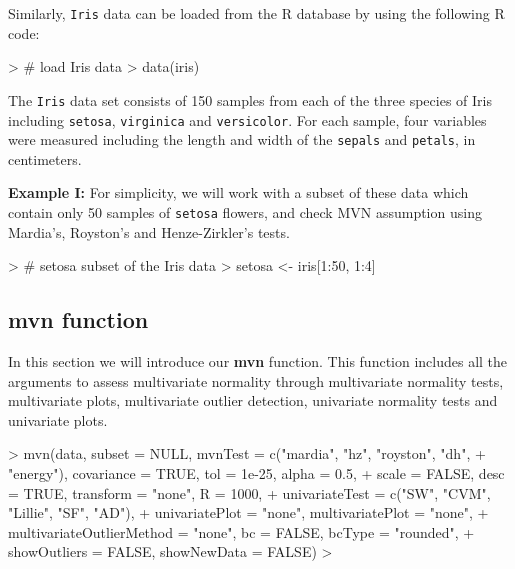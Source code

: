 \documentclass[11pt]{article}
\begin{document}
Similarly, \texttt{Iris} data can be loaded from the R database by using the following R code:


\begin{Schunk}
\begin{Sinput}
> # load Iris data
> data(iris)
\end{Sinput}
\end{Schunk}

The \texttt{Iris} data set consists of 150 samples from each of the three species of Iris including \texttt{setosa}, \texttt{virginica} and \texttt{versicolor}. For each sample, four variables were measured including the length and width of the \texttt{sepals} and \texttt{petals}, in centimeters. \\
\newline

\textbf{Example I:} For simplicity, we will work with a subset of these data which contain only 50 samples of \texttt{setosa} flowers, and check MVN assumption using Mardia's, Royston's and Henze-Zirkler's tests.


\begin{Schunk}
\begin{Sinput}
> # setosa subset of the Iris data
> setosa <- iris[1:50, 1:4]
\end{Sinput}
\end{Schunk}

\subsection{mvn function} \label{subsec:mvntexttt}
In this section we will introduce our \textbf{mvn} function. This function includes all the arguments to assess multivariate normality through  multivariate normality tests, multivariate plots, multivariate outlier detection, univariate normality tests and univariate plots.


\begin{Schunk}
\begin{Sinput}
> mvn(data, subset = NULL, mvnTest = c("mardia", "hz", "royston", "dh",
+   "energy"), covariance = TRUE, tol = 1e-25, alpha = 0.5,
+   scale = FALSE, desc = TRUE, transform = "none", R = 1000,
+   univariateTest = c("SW", "CVM", "Lillie", "SF", "AD"),
+   univariatePlot = "none", multivariatePlot = "none",
+   multivariateOutlierMethod = "none", bc = FALSE, bcType = "rounded",
+   showOutliers = FALSE, showNewData = FALSE)
> 
\end{Sinput}
\end{Schunk}
\end{document}
